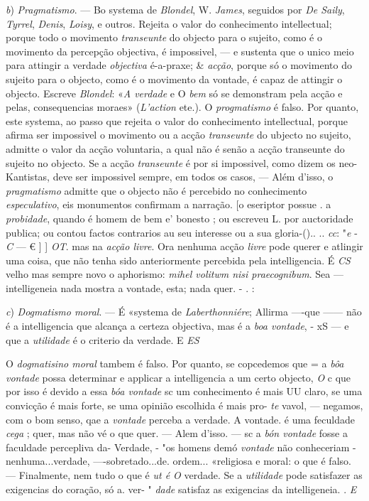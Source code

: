 \emph{b}) \emph{Pragmatismo}. --- Bo systema de \emph{Blondel}, W. \emph{James}, seguidos por \emph{De Saily}, \emph{Tyrrel}, \emph{Denis}, \emph{Loisy}, e outros. Rejeita o valor do conhecimento intellectual; porque todo o movimento \emph{transeunte} do objecto para o sujeito, como é o movimento da percepção objectiva, é impossivel, --- e sustenta que o unico meio para attingir a verdade \emph{objectiva} é-a-praxe; \& \emph{acção}, porque só o movimento do sujeito para o objecto, como é o movimento da vontade, é capaz de attingir o objecto. Escreve \emph{Blondel}: «\emph{A verdade} e O \emph{bem} só se demonstram pela acção e pelas, consequencias moraes» (\emph{L'action} ete.). O \emph{progmatismo} é falso. Por quanto, este systema, ao passo que rejeita o valor do conhecimento intellectual, porque afirma ser impossivel o movimento ou a acção \emph{transeunte} do ubjecto no sujeito, admitte o valor da acção voluntaria, a qual não é senão a acção transeunte do sujeito no objecto. Se a acção \emph{transeunte} é por si impossivel, como dizem os neo-Kantistas, deve ser impossivel sempre, em todos os casos, --- Além d'isso, o \emph{pragmatismo} admitte que o objecto não é percebido no conhecimento \emph{especulativo},   eis monumentos confirmam a narração. [o eseriptor possue . a \emph{probidade}, quando é homem de bem e' bonesto ; ou escreveu L. por auctoridade publica; ou contou factos contrarios au seu interesse ou a sua gloria-().. .. \emph{cc}: "\emph{e} - \emph{C} --- € ] ] \emph{OT}. mas na \emph{acção livre}. Ora nenhuma acção \emph{livre} pode querer e atlingir uma coisa, que não tenha sido anteriormente percebida pela intelligencia. É \emph{CS} velho mas sempre novo o aphorismo: \emph{mihel volitwm nisi praecognibum}. Sea --- intelligeneia nada mostra a vontade, esta; nada quer. - . :

\emph{c}) \emph{Dogmatismo moral}. --- É «systema de \emph{Laberthonniére}; Allirma ----que ------ não é a intelligencia que alcança a certeza objectiva, mas é a \emph{boa vontade}, - xS --- e que a \emph{utilidade} é o criterio da verdade. E \emph{ES}

O \emph{dogmatisino moral} tambem é falso. Por quanto, se copcedemos que = a \emph{bôa vontade} possa determinar e applicar a intelligencia a um certo objecto, \emph{O} c que por isso é devido a essa \emph{bóa vontade} sc um conhecimento é mais UU claro, se uma convicção é mais forte, se uma opinião escolhida é mais pro- \emph{te} vavol, --- negamos, com o bom senso, qae a \emph{vontade} perceba a verdade. A vontade. é uma feculdade \emph{cega} ; quer, mas não vé o que quer. --- Alem d'isso. --- sc a \emph{bón vontade} fosse a faculdade percepliva da- Verdade, - "os homens demó \emph{vontade} não conheceriam -nenhuma...verdade, ----sobretado...de. ordem... «religiosa e moral: o que é falso. --- Finalmente, nem tudo o que é \emph{ut é O} verdade. Se a \emph{utilidade} pode satisfazer as exigencias do coração, só a. ver- " \emph{dade} satisfaz as exigencias da intelligeneia. . \emph{E}

